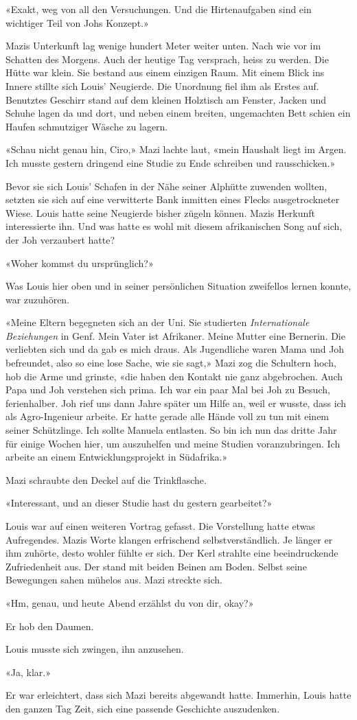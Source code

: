 «Exakt, weg von all den Versuchungen. Und die Hirtenaufgaben sind ein
wichtiger Teil von Johs Konzept.»

Mazis Unterkunft lag wenige hundert Meter weiter unten. Nach wie vor im Schatten
des Morgens. Auch der heutige Tag versprach, heiss zu werden.
Die Hütte war klein. Sie bestand aus einem einzigen Raum. Mit einem
Blick ins Innere stillte sich Louis’ Neugierde. Die Unordnung fiel ihm als Erstes auf. 
Benutztes Geschirr stand auf dem kleinen Holztisch am Fenster, Jacken und Schuhe lagen da und dort,
und neben einem breiten, ungemachten Bett schien ein Haufen schmutziger
Wäsche zu lagern.

«Schau nicht genau hin, Ciro,» Mazi lachte laut, «mein Haushalt liegt im
Argen. Ich musste gestern dringend eine Studie zu Ende schreiben und
rausschicken.»

Bevor sie sich Louis’ Schafen in der Nähe seiner Alphütte zuwenden
wollten, setzten sie sich auf eine verwitterte Bank inmitten eines Flecks ausgetrockneter Wiese.
Louis hatte seine Neugierde bisher zügeln können. Mazis Herkunft
interessierte ihn. Und was hatte es wohl mit diesem afrikanischen Song
auf sich, der Joh verzaubert hatte?

«Woher kommst du ursprünglich?»

Was Louis hier oben und in seiner persönlichen Situation zweifellos
lernen konnte, war zuzuhören.

«Meine Eltern begegneten sich an der Uni. Sie studierten
\emph{Internationale Beziehungen} in Genf. Mein Vater ist Afrikaner. Meine Mutter eine
Bernerin. Die verliebten sich und da gab es mich draus. Als Jugendliche
waren Mama und Joh befreundet, also so eine lose Sache, wie sie sagt,»
Mazi zog die Schultern hoch, hob die Arme und grinste, «die haben den
Kontakt nie ganz abgebrochen. Auch Papa und Joh verstehen sich prima.
Ich war ein paar Mal bei Joh zu Besuch, ferienhalber. Joh rief uns dann
Jahre später um Hilfe an, weil er wusste, dass ich als Agro-Ingenieur
arbeite. Er hatte gerade alle Hände voll zu tun mit einem seiner
Schützlinge. Ich sollte Manuela entlasten. So bin ich nun das dritte
Jahr für einige Wochen hier, um auszuhelfen und meine Studien
voranzubringen. Ich arbeite an einem Entwicklungsprojekt in Südafrika.»

Mazi schraubte den Deckel auf die Trinkflasche.

«Interessant, und an dieser Studie hast du gestern gearbeitet?»

Louis war auf einen weiteren Vortrag gefasst. Die Vorstellung
hatte etwas Aufregendes. Mazis Worte klangen erfrischend 
selbstverständlich. Je länger er ihm zuhörte, desto wohler fühlte er
sich. Der Kerl strahlte eine beeindruckende Zufriedenheit aus. Der stand mit beiden Beinen am
Boden. Selbst seine Bewegungen sahen mühelos aus. Mazi streckte sich.

«Hm, genau, und heute Abend erzählst du von dir, okay?»

Er hob den Daumen.

Louis musste sich zwingen, ihn anzusehen.

«Ja, klar.»

Er war erleichtert, dass sich Mazi bereits abgewandt hatte. Immerhin,
Louis hatte den ganzen Tag Zeit, sich eine passende Geschichte
auszudenken.
